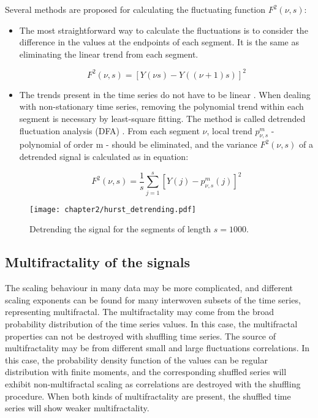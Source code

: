 Several methods are proposed for calculating the fluctuating function $F^2(\nu, s)$:
\begin{itemize}
	\item The most straightforward way to calculate the fluctuations is to consider the difference in the values at the endpoints of each segment. It is the same as eliminating the linear trend from each segment.  
	
	$$ F^2(\nu, s) = [Y(\nu s) - Y((\nu +1)s)]^2$$ 
	
	\item The trends present in the time series do not have to be linear \cite{hu2001effect}. When dealing with non-stationary time series, removing the polynomial trend within each segment is necessary by least-square fitting. The method is called detrended fluctuation analysis (DFA) \cite{kantelhardt2001detecting}. From each segment $\nu$, local trend $p^m_{\nu, s}$ - polynomial of order m - should be eliminated, and the variance $F^2(\nu, s)$ of a detrended signal is calculated as in equation:
	
	\begin{equation}
	F^2(\nu, s) = \frac{1}{s}\sum_{j=1}^s \left[Y(j) - p^m_{\nu, s}(j)\right]^2
	\label{eq:var}
	\end{equation}
\end{itemize}
\begin{figure}[h]
	\centering
	\texttt{[image: chapter2/hurst\_detrending.pdf]}
	\caption{Detrending the signal for the segments of length $s=1000$.}
	\label{fig:hurst_detrending}
\end{figure}



\subsection{Multifractality of the signals}

The scaling behaviour in many data may be more complicated, and different scaling exponents can be found for many interwoven subsets of the time series, representing multifractal. The multifractality may come from the broad probability distribution of the time series values. In this case, the multifractal properties can not be destroyed with shuffling time series. The source of multifractality may be from different small and large fluctuations correlations. In this case, the probability density function of the values can be regular distribution with finite moments, and the corresponding shuffled series will exhibit non-multifractal scaling as correlations are destroyed with the shuffling procedure. When both kinds of multifractality are present, the shuffled time series will show weaker multifractality. 

